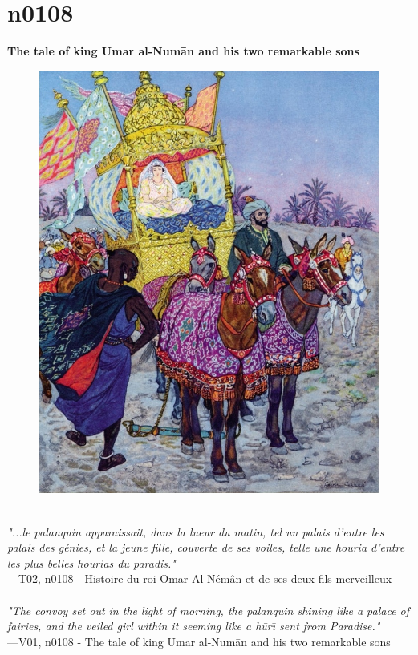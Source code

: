 \documentclass[../Carre_nights.tex]{subfiles}
\begin{document}
\newpage

\section{n0108}
\textbf{\Large{The tale of king Umar al-Num\=an and his two remarkable sons}} \\

\begin{figure}[ht]
\centering
\includegraphics[height=\figsize]{illustrations/volume_2/T02, n0108 - Histoire du roi Omar Al-Némân et de ses deux fils merveilleux.jpg}
\end{figure}

\textit{\\
"...le palanquin apparaissait, dans la lueur du matin, tel un palais d’entre les palais des génies, et la jeune fille, couverte de ses voiles, telle une houria d’entre les plus belles hourias du paradis."} \\
—T02, n0108 - Histoire du roi Omar Al-Némân et de ses deux fils merveilleux \\~\\
\textit{"The convoy set out in the light of morning, the palanquin shining like a palace of fairies, and the veiled girl within it seeming like a h\=ur\={\i} sent from Paradise."} \\
—V01, n0108 - The tale of king Umar al-Num\=an and his two remarkable sons
\end{document}
